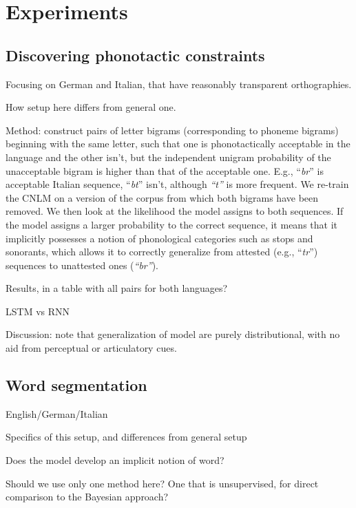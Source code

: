 \section{Experiments}
\label{sec:experiments}

\subsection{Discovering phonotactic constraints}
\label{sec:phonotactics}

Focusing on German and Italian, that have reasonably transparent
orthographies.

How setup here differs from general one.

Method: construct pairs of letter bigrams (corresponding to phoneme
bigrams) beginning with the same letter, such that one is
phonotactically acceptable in the language and the other isn't, but
the independent unigram probability of the unacceptable bigram is
higher than that of the acceptable one. E.g., ``\emph{br}'' is
acceptable Italian sequence, ``\emph{bt}'' isn't, although
\emph{``t''} is more frequent. We re-train the CNLM on a version of
the corpus from which both bigrams have been removed. We then look at
the likelihood the model assigns to both sequences. If the model
assigns a larger probability to the correct sequence, it means that it
implicitly possesses a notion of phonological categories such as
stops and sonorants, which allows it to correctly generalize from
attested (e.g., ``\emph{tr}'') sequences to unattested ones
(\emph{``br''}).

Results, in a table with all pairs for both languages?

LSTM vs RNN

Discussion: note that generalization of model are purely
distributional, with no aid from perceptual or articulatory cues.

\subsection{Word segmentation}
\label{sec:segmentation}

English/German/Italian

Specifics of this setup, and differences from general setup

Does the model develop an implicit notion of word?

Should we use only one method here? One that is unsupervised, for
direct comparison to the Bayesian approach?

